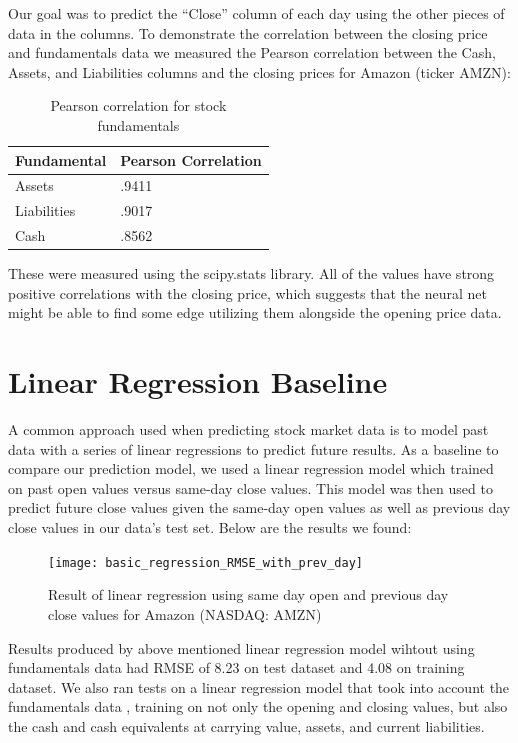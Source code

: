 \documentclass{article}
\begin{document}
Our goal was to predict the “Close” column of each day using the other pieces of data in the columns. To demonstrate the correlation between the closing price and fundamentals data we measured the Pearson correlation between the Cash, Assets, and Liabilities columns and the closing prices for Amazon (ticker AMZN):
\begin{table}[H]
\centering
\begin{adjustbox}{width=0.3\textwidth}
\small
\begin{tabular}{|l|l|}
\hline
Fundamental & Pearson Correlation \\ \hline
Assets      & .9411               \\ \hline
Liabilities & .9017               \\ \hline
Cash        & .8562               \\ \hline
\end{tabular}
\end{adjustbox}
\caption{Pearson correlation for stock fundamentals}
\label{my-label}
\end{table}
These were measured using the scipy.stats library. All of the values have strong positive correlations with the closing price, which suggests that the neural net might be able to find some edge utilizing them alongside the opening price data. 

\section{Linear Regression Baseline}
\label{sec:linear_regression}
A common approach used when predicting stock market data is to model past data with a series of linear regressions to predict future results. As a baseline to compare our prediction model, we used a linear regression model which trained on past open values versus same-day close values. This model was then used to predict future close values given the same-day open values as well as previous day close values in our data’s test set. Below are the results we found:

\begin{figure}[H]
\centering
\texttt{[image: basic\_regression\_RMSE\_with\_prev\_day]}
\caption{Result of linear regression using same day open and previous day close values for Amazon (NASDAQ: AMZN)}
\label{fig:linear_withoutfunda}
\end{figure}

Results produced by above mentioned linear regression model wihtout using fundamentals data had RMSE of 8.23 on test dataset and 4.08 on training dataset. We also ran tests on a linear regression model that took into account the fundamentals data , training on not only the opening and closing values, but also the cash and cash equivalents at carrying value, assets, and current liabilities. 
\end{document}
